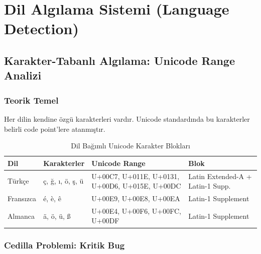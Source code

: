 \section{Dil Alg{\i}lama Sistemi (Language Detection)}
\label{sec:language-detection}

\subsection{Karakter-Tabanl{\i} Alg{\i}lama: Unicode Range Analizi}

\subsubsection{Teorik Temel}

Her dilin kendine \"{o}zg\"{u} karakterleri vard{\i}r. Unicode standard{\i}nda bu karakterler belirli code point'lere atanm{\i}\c{s}t{\i}r.

\begin{table}[H]
\centering
\caption{Dil Ba\u{g}{\i}ml{\i} Unicode Karakter Bloklar{\i}}
\label{tab:unicode-blocks}
\begin{tabularx}{\textwidth}{lllX}
\toprule
\color{chapterBlue}\textbf{Dil} & \color{chapterBlue}\textbf{Karakterler} & \color{chapterBlue}\textbf{Unicode Range} & \color{chapterBlue}\textbf{Blok} \\
\midrule
T\"{u}rk\c{c}e    & \c{c}, \u{g}, {\i}, \"{o}, \c{s}, \"{u}    & U+00C7, U+011E, U+0131, U+00D6, U+015E, U+00DC & Latin Extended-A + Latin-1 Supp. \\
Frans{\i}zca & \'{e}, \`{e}, \^{e}    & U+00E9, U+00E8, U+00EA & Latin-1 Supplement \\
Almanca   & \"{a}, \"{o}, \"{u}, \ss & U+00E4, U+00F6, U+00FC, U+00DF & Latin-1 Supplement \\
\bottomrule
\end{tabularx}
\end{table}

\subsubsection{Cedilla Problemi: Kritik Bug}

